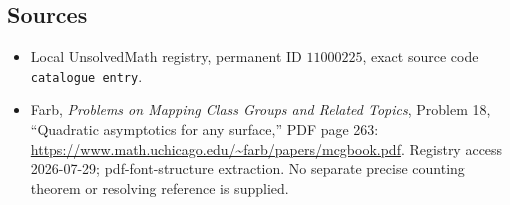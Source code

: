 \documentclass[11pt]{article}
\begin{document}
\subsection{Sources}
\begin{itemize}
\item Local UnsolvedMath registry, permanent ID \(11000225\), exact source code \texttt{catalogue entry}.
\item Farb, \emph{Problems on Mapping Class Groups and Related Topics}, Problem 18, ``Quadratic asymptotics for any surface,'' PDF page 263: \url{https://www.math.uchicago.edu/~farb/papers/mcgbook.pdf}. Registry access 2026-07-29; pdf-font-structure extraction. No separate precise counting theorem or resolving reference is supplied.
\end{itemize}
\end{document}
